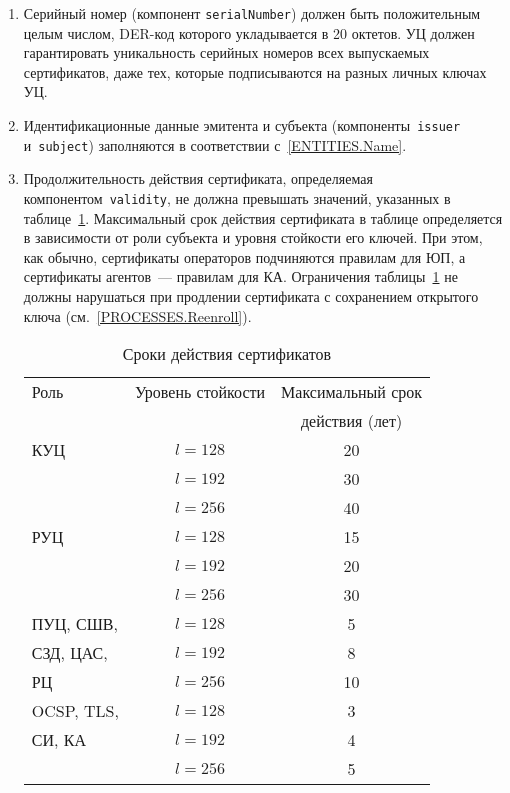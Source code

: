 \begin{enumerate}
\item
Серийный номер (компонент \texttt{serialNumber}) 
должен быть положительным целым 
числом, DER-код которого укладывается в 20 октетов.
%
УЦ должен гарантировать уникальность серийных 
номеров всех выпускаемых сертификатов, даже тех, которые 
подписываются на разных личных ключах УЦ.

\item
Идентификационные данные эмитента и субъекта (компоненты~\texttt{issuer} 
и~\texttt{subject}) заполняются в соответствии с~\ref{ENTITIES.Name}.

\item
Продолжительность действия сертификата, определяемая 
компонентом~\texttt{validity}, не должна превышать  
значений, указанных в таблице~\ref{Table.CERT.Validity}. 
%
Максимальный срок действия сертификата в таблице определяется в 
зависимости от роли субъекта и уровня стойкости его ключей.  
%
При этом, как обычно, сертификаты операторов подчиняются правилам для ЮП, 
а сертификаты агентов~--- правилам для КА.
%
Ограничения таблицы~\ref{Table.CERT.Validity} не должны нарушаться
при продлении сертификата с сохранением открытого ключа 
(см.~\ref{PROCESSES.Reenroll}).

\begin{table}[H]
\caption{Сроки действия сертификатов}
\label{Table.CERT.Validity}
\begin{tabular}{|l|c|c|}
\hline
Роль  & Уровень стойкости & Максимальный срок\\
      &                   & действия (лет)\\
\hline
\hline

КУЦ & $l=128$ & 20\\
\cline{2-3} & $l=192$ & 30\\
\cline{2-3} & $l=256$ & 40\\
\hline

РУЦ & $l=128$ & 15\\
\cline{2-3} & $l=192$ & 20\\
\cline{2-3} & $l=256$ & 30\\
\hline

ПУЦ, СШВ,    & $l=128$ & 5\\
\cline{2-3}
СЗД, ЦАС,    & $l=192$ & 8\\
\cline{2-3} 
РЦ           & $l=256$ & 10\\
\hline

OCSP, TLS,  & $l=128$ & 3 \\
\cline{2-3}
СИ, КА & $l=192$ & 4\\
\cline{2-3} & $l=256$ & 5\\
\hline


\end{tabular}
\end{table}
\end{enumerate}
